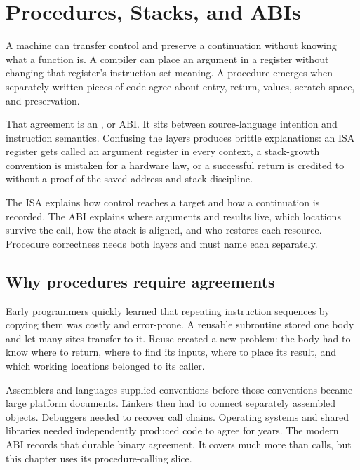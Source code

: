 \chapter{Procedures, Stacks, and ABIs}
\label{ch:procedures-abis}

A machine can transfer control and preserve a continuation without knowing
what a function is. A compiler can place an argument in a register without
changing that register's instruction-set meaning. A procedure emerges when
separately written pieces of code agree about entry, return, values, scratch
space, and preservation.

That agreement is an , or ABI. It sits
between source-language intention and instruction semantics. Confusing the
layers produces brittle explanations: an ISA register gets called an argument
register in every context, a stack-growth convention is mistaken for a
hardware law, or a successful return is credited to  without a
proof of the saved address and stack discipline.

\begin{keyidea}[title={A call mechanism is not a calling convention}]
The ISA explains how control reaches a target and how a continuation is
recorded. The ABI explains where arguments and results live, which locations
survive the call, how the stack is aligned, and who restores each resource.
Procedure correctness needs both layers and must name each separately.
\end{keyidea}

\section{Why procedures require agreements}

Early programmers quickly learned that repeating instruction sequences by
copying them was costly and error-prone. A reusable subroutine stored one body
and let many sites transfer to it. Reuse created a new problem: the body had
to know where to return, where to find its inputs, where to place its result,
and which working locations belonged to its caller.

Assemblers and languages supplied conventions before those conventions became
large platform documents. Linkers then had to connect separately assembled
objects. Debuggers needed to recover call chains. Operating systems and shared
libraries needed independently produced code to agree for years. The modern
ABI records that durable binary agreement. It covers much more than calls,
but this chapter uses its procedure-calling slice.

